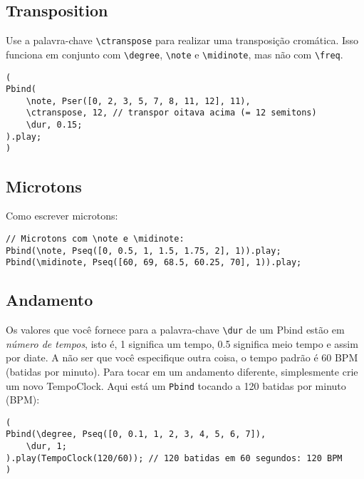\subsection{Transposition}

Use a palavra-chave \texttt{\textbackslash ctranspose} para realizar uma transposição cromática. Isso funciona em conjunto com \texttt{\textbackslash degree}, \texttt{\textbackslash note} e \texttt{\textbackslash midinote}, mas não com \texttt{\textbackslash freq}.

\begin{lstlisting}[style=SuperCollider-IDE, basicstyle=\scttfamily\footnotesize]
(
Pbind(
	\note, Pser([0, 2, 3, 5, 7, 8, 11, 12], 11),
	\ctranspose, 12, // transpor oitava acima (= 12 semitons)
	\dur, 0.15;
).play;
)
\end{lstlisting}

\subsection{Microtons}
 
Como escrever microtons:

\begin{lstlisting}[style=SuperCollider-IDE, basicstyle=\scttfamily\footnotesize]
// Microtons com \note e \midinote:
Pbind(\note, Pseq([0, 0.5, 1, 1.5, 1.75, 2], 1)).play;
Pbind(\midinote, Pseq([60, 69, 68.5, 60.25, 70], 1)).play;
\end{lstlisting}
 
\subsection{Andamento}

Os valores que você fornece para a palavra-chave \texttt{\textbackslash dur} de um Pbind estão em \emph{número de tempos}, isto é, 1 significa um tempo, 0.5 significa meio tempo e assim por diate. A não ser que você especifique outra coisa, o tempo padrão é 60 BPM (batidas por minuto). Para tocar em um andamento diferente, simplesmente crie um novo TempoClock. Aqui está um \texttt{Pbind} tocando a 120 batidas por minuto (BPM):
 
\begin{lstlisting}[style=SuperCollider-IDE, basicstyle=\scttfamily\footnotesize]
(
Pbind(\degree, Pseq([0, 0.1, 1, 2, 3, 4, 5, 6, 7]),
	\dur, 1;
).play(TempoClock(120/60)); // 120 batidas em 60 segundos: 120 BPM
)
\end{lstlisting}
 
